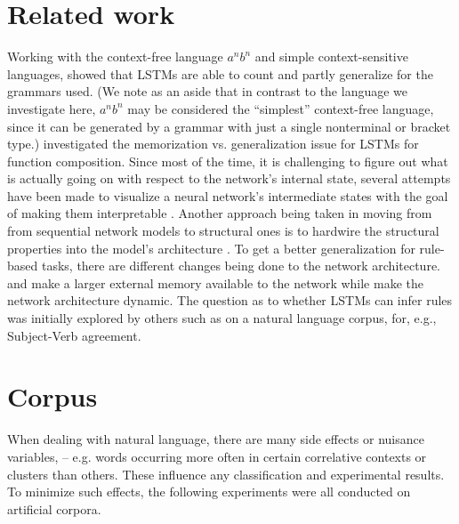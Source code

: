 \documentclass[11pt,a4paper]{article}
\begin{document}
\section{Related work}
Working with the context-free language $a^nb^n$ and simple context-sensitive languages, \citeauthor{gers2001lstm}  showed that LSTMs are able to count and partly generalize for the grammars used.  (We note as an aside that in contrast to the language we investigate here, $a^nb^n$ may be considered the ``simplest'' context-free language, since it can be generated by a grammar with just a single nonterminal or bracket type.)
\citeauthor{liska2018memorize}  investigated the memorization vs. generalization issue for LSTMs for function composition. Since most of the time, it is challenging to figure out what is actually going on with respect to the network's internal state, several attempts have been made to visualize a neural network's intermediate states \cite{rauber2017visualizing, karpathy2015visualizing} with the goal of making them interpretable \cite{krakovna2016increasing}.
Another approach being taken in moving from from sequential network models to structural ones is to hardwire the structural properties into the model's architecture \cite{tai2015improved, kiperwasser2016simple, joulin2015inferring}.
To get a better generalization for rule-based tasks, there are different changes being done to the network architecture. \citeauthor{graves2014neural}  and \citeauthor{sukhbaatar2015end}  make a larger external memory available to the network while \citeauthor{moshe2017deep}  make the network architecture dynamic.
The question as to whether LSTMs can infer rules was initially explored by others such as \cite{linzen2016assessing} on a natural language corpus, for, e.g., Subject-Verb agreement.

\section{Corpus}
\label{sec:corpus}
When dealing with natural language, there are many side effects  or nuisance variables,  -- e.g. words occurring more often in certain correlative contexts or clusters than others.  These influence any classification and experimental results. To minimize such effects, the following experiments were all conducted on artificial corpora.
\end{document}
